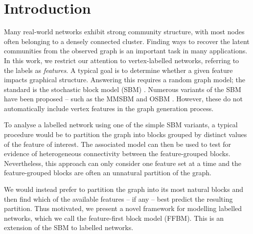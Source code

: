 \section{Introduction}

Many real-world networks exhibit strong community structure, with most nodes often belonging to a densely connected cluster. 
Finding ways to recover the latent communities from the observed graph is an important
task in many applications. In this work, we restrict our attention to vertex-labelled networks, 
referring to the labels as {\em features}. A typical goal is to determine whether a given feature impacts graphical structure. Answering this requires a random graph model; the standard is the stochastic block model (SBM) \cite{vanilla-sbm}. Numerous variants of the SBM  have been proposed -- such as the MMSBM \cite{mixed-membership-sbm} and OSBM \cite{overlapping-sbm}. However, these do not automatically include vertex features in the graph generation process.

To analyse a labelled network using one of the simple SBM variants, a typical procedure would be to partition the graph into blocks grouped by distinct values of the feature of interest. The associated model can then be used to test for evidence of heterogeneous connectivity between the feature-grouped blocks. Nevertheless, this approach can only consider one feature set at a time and the feature-grouped blocks are often an unnatural partition of the graph.

We would instead prefer to partition the graph into its most natural blocks and then find which of the available features -- if any -- best predict the resulting partition. Thus motivated, we present a novel framework for modelling labelled networks, which we call the feature-first block model (FFBM). This is an extension of the SBM to labelled networks.